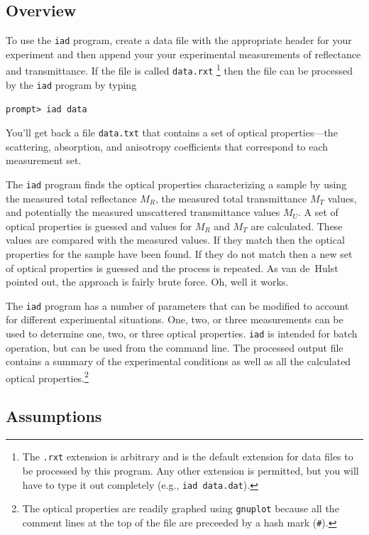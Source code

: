 \documentclass{article}
\newcommand\iadprog{\texttt{iad}}
\begin{document}
\subsection{Overview}
To use the \iadprog{} program, create a data file with
the appropriate header for your experiment and then append your your
experimental measurements of reflectance and transmittance.  If the file is
called \texttt{data.rxt}%
\footnote{The \texttt{.rxt} extension is arbitrary and is the default extension
for data files to be processed by this program.  Any other extension is permitted,
but you will have to type it out completely (e.g., \texttt{iad data.dat}).} 
then the file can be processed by the \iadprog{} program by typing
\begin{center}
\texttt{prompt> iad data}
\end{center}
You'll get back a file \texttt{data.txt}
that contains a set of optical properties---the scattering, absorption, and
anisotropy coefficients that correspond to each measurement set.   

The \iadprog{} program finds the optical properties characterizing a sample by using
the measured total reflectance $M_R$, the measured total transmittance $M_T$ values,
and potentially the measured unscattered transmittance values $M_U$.  
A set of optical properties is guessed
and values for $M_R$ and $M_T$ are calculated.  These values are compared
with the measured values.  If they match then the
optical properties for the sample have been found.  If they do not match then a
new set of optical properties is guessed and the process is repeated. As van
de~Hulst pointed out, the approach is fairly brute force.  Oh, well it works.

The \iadprog{} program has a number of parameters that can be modified to 
account for
different experimental situations.  One, two, or three measurements can be used 
to determine one, two, or
three optical properties.  \iadprog{} is intended for batch
operation, but can be used from the command line.  The processed output file
contains a summary of the experimental conditions as well as all the 
calculated optical properties.\footnote{The optical properties are readily graphed using \texttt{gnuplot} because all the comment lines at the
top of the file are preceeded by a hash mark (\texttt{\#}).}

\subsection{Assumptions}
\end{document}
